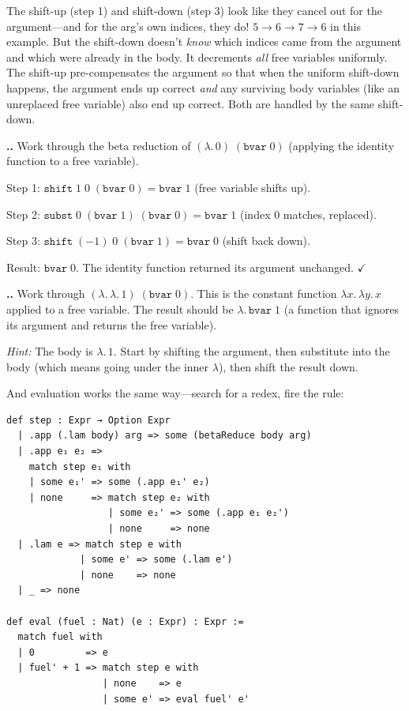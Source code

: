 \documentclass[11pt,a4paper]{article}
\newcounter{exercise}[section]
\renewcommand{\theexercise}{\thesection.\arabic{exercise}}
\theoremstyle{definition}
\newcommand{\lam}{\lambda}
\begin{document}
\begin{intuition}
The shift-up (step 1) and shift-down (step 3) look like they cancel out for the
argument---and for the arg's own indices, they do! $5 \to 6 \to 7 \to 6$ in
this example. But the shift-down doesn't \emph{know} which indices came from
the argument and which were already in the body. It decrements \emph{all}
free variables uniformly. The shift-up pre-compensates the argument so that
when the uniform shift-down happens, the argument ends up correct \emph{and}
any surviving body variables (like an unreplaced free variable) also end up
correct. Both are handled by the same shift-down.
\end{intuition}

\begin{exercisebox}
\textbf{\theexercise.}\; Work through the beta reduction of $(\lam.\,0)\;(\texttt{bvar}\;0)$ (applying the identity function to a free variable).

Step 1: $\texttt{shift}\;1\;0\;(\texttt{bvar}\;0) = \texttt{bvar}\;1$ (free variable shifts up).

Step 2: $\texttt{subst}\;0\;(\texttt{bvar}\;1)\;(\texttt{bvar}\;0) = \texttt{bvar}\;1$ (index 0 matches, replaced).

Step 3: $\texttt{shift}\;(-1)\;0\;(\texttt{bvar}\;1) = \texttt{bvar}\;0$ (shift back down).

Result: $\texttt{bvar}\;0$. The identity function returned its argument unchanged. $\checkmark$
\end{exercisebox}

\begin{exercisebox}
\textbf{\theexercise.}\; Work through $(\lam.\, \lam.\, 1)\;(\texttt{bvar}\;0)$. This is the constant function $\lam x.\,\lam y.\, x$ applied to a free variable. The result should be $\lam.\, \texttt{bvar}\;1$ (a function that ignores its argument and returns the free variable).

\emph{Hint:} The body is $\lam.\, 1$. Start by shifting the argument, then substitute into the body (which means going under the inner $\lam$), then shift the result down.
\end{exercisebox}

And evaluation works the same way---search for a redex, fire the rule:

\begin{verbatim}
def step : Expr → Option Expr
  | .app (.lam body) arg => some (betaReduce body arg)
  | .app e₁ e₂ =>
    match step e₁ with
    | some e₁' => some (.app e₁' e₂)
    | none     => match step e₂ with
                  | some e₂' => some (.app e₁ e₂')
                  | none     => none
  | .lam e => match step e with
             | some e' => some (.lam e')
             | none    => none
  | _ => none

def eval (fuel : Nat) (e : Expr) : Expr :=
  match fuel with
  | 0         => e
  | fuel' + 1 => match step e with
                 | none    => e
                 | some e' => eval fuel' e'
\end{verbatim}
\end{document}
